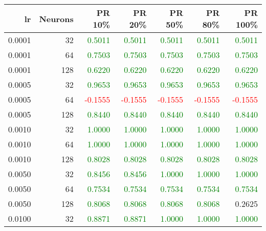 \begin{tabular}{rrrrrrr}
\toprule
lr & Neurons & PR 10\% & PR 20\% & PR 50\% & PR 80\% & PR 100\% \\
\midrule
0.0001 & 32 & \textcolor{green} {0.5011} & \textcolor{green} {0.5011} & \textcolor{green} {0.5011} & \textcolor{green} {0.5011} & \textcolor{green} {0.5011} \\
0.0001 & 64 & \textcolor{green} {0.7503} & \textcolor{green} {0.7503} & \textcolor{green} {0.7503} & \textcolor{green} {0.7503} & \textcolor{green} {0.7503} \\
0.0001 & 128 & \textcolor{green} {0.6220} & \textcolor{green} {0.6220} & \textcolor{green} {0.6220} & \textcolor{green} {0.6220} & \textcolor{green} {0.6220} \\
0.0005 & 32 & \textcolor{green} {0.9653} & \textcolor{green} {0.9653} & \textcolor{green} {0.9653} & \textcolor{green} {0.9653} & \textcolor{green} {0.9653} \\
0.0005 & 64 & \textcolor{red} {-0.1555} & \textcolor{red} {-0.1555} & \textcolor{red} {-0.1555} & \textcolor{red} {-0.1555} & \textcolor{red} {-0.1555} \\
0.0005 & 128 & \textcolor{green} {0.8440} & \textcolor{green} {0.8440} & \textcolor{green} {0.8440} & \textcolor{green} {0.8440} & \textcolor{green} {0.8440} \\
0.0010 & 32 & \textcolor{green} {1.0000} & \textcolor{green} {1.0000} & \textcolor{green} {1.0000} & \textcolor{green} {1.0000} & \textcolor{green} {1.0000} \\
0.0010 & 64 & \textcolor{green} {1.0000} & \textcolor{green} {1.0000} & \textcolor{green} {1.0000} & \textcolor{green} {1.0000} & \textcolor{green} {1.0000} \\
0.0010 & 128 & \textcolor{green} {0.8028} & \textcolor{green} {0.8028} & \textcolor{green} {0.8028} & \textcolor{green} {0.8028} & \textcolor{green} {0.8028} \\
0.0050 & 32 & \textcolor{green} {0.8456} & \textcolor{green} {0.8456} & \textcolor{green} {1.0000} & \textcolor{green} {1.0000} & \textcolor{green} {1.0000} \\
0.0050 & 64 & \textcolor{green} {0.7534} & \textcolor{green} {0.7534} & \textcolor{green} {0.7534} & \textcolor{green} {0.7534} & \textcolor{green} {0.7534} \\
0.0050 & 128 & \textcolor{green} {0.8068} & \textcolor{green} {0.8068} & \textcolor{green} {0.8068} & \textcolor{green} {0.8068} & \textcolor{blu} {0.2625} \\
0.0100 & 32 & \textcolor{green} {0.8871} & \textcolor{green} {0.8871} & \textcolor{green} {1.0000} & \textcolor{green} {1.0000} & \textcolor{green} {1.0000} \\

\end{tabular}
